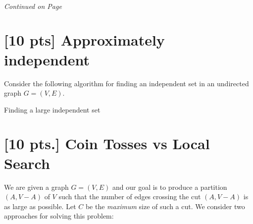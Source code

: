 \documentclass[11pt]{article}
\begin{document}
\label{pg:end-of-p3}

% 
\paragraph{} \emph{Continued on Page \pageref{pg:p3-continuation}}

\newpage

\section{[10 pts] Approximately independent}

Consider the following algorithm for finding an independent set in an 
undirected graph $G=(V,E)$.

\begin{algorithm}
  \caption{Finding a large independent set}
  \begin{algorithmic}[1]
    \EndWhile
  \end{algorithmic}
\end{algorithm}

\label{pg:end-of-p4}




\newpage

\section{[10 pts.] Coin Tosses vs Local Search}

We are given a graph $G = (V,E)$ and our goal is to produce a partition
$(A,V-A)$ of $V$ such that the number of edges crossing the cut $(A,V-A)$
is as large as possible. Let $C$ be the \emph{maximum} size of such a cut. We
consider two approaches for solving this problem:
\end{document}
